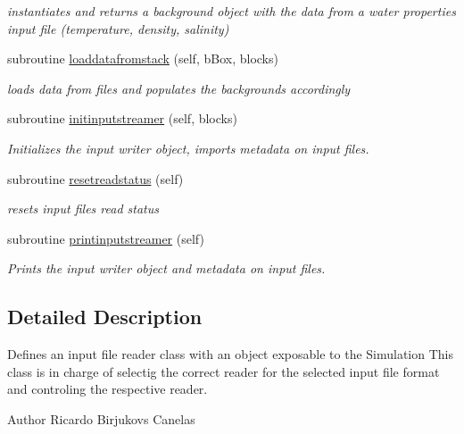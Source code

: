 \begin{DoxyCompactItemize}
\begin{DoxyCompactList}\small\item\em instantiates and returns a background object with the data from a water properties input file (temperature, density, salinity) \end{DoxyCompactList}\item 
subroutine \mbox{\hyperlink{namespacesimulationinputstreamer__mod_a3d4540f8e04cc0215895cad65c5be952}{loaddatafromstack}} (self, b\+Box, blocks)
\begin{DoxyCompactList}\small\item\em loads data from files and populates the backgrounds accordingly \end{DoxyCompactList}\item 
subroutine \mbox{\hyperlink{namespacesimulationinputstreamer__mod_a9f81731f839f49c42a281c1334f528da}{initinputstreamer}} (self, blocks)
\begin{DoxyCompactList}\small\item\em Initializes the input writer object, imports metadata on input files. \end{DoxyCompactList}\item 
subroutine \mbox{\hyperlink{namespacesimulationinputstreamer__mod_a9465e29f527366e5f6d9a1195de6ddee}{resetreadstatus}} (self)
\begin{DoxyCompactList}\small\item\em resets input files read status \end{DoxyCompactList}\item 
subroutine \mbox{\hyperlink{namespacesimulationinputstreamer__mod_a1b906bc5ba1fac8d846b30237216aca4}{printinputstreamer}} (self)
\begin{DoxyCompactList}\small\item\em Prints the input writer object and metadata on input files. \end{DoxyCompactList}\end{DoxyCompactItemize}


\subsection{Detailed Description}
Defines an input file reader class with an object exposable to the Simulation This class is in charge of selectig the correct reader for the selected input file format and controling the respective reader. 

\begin{DoxyAuthor}{Author}
Ricardo Birjukovs Canelas 
\end{DoxyAuthor}



